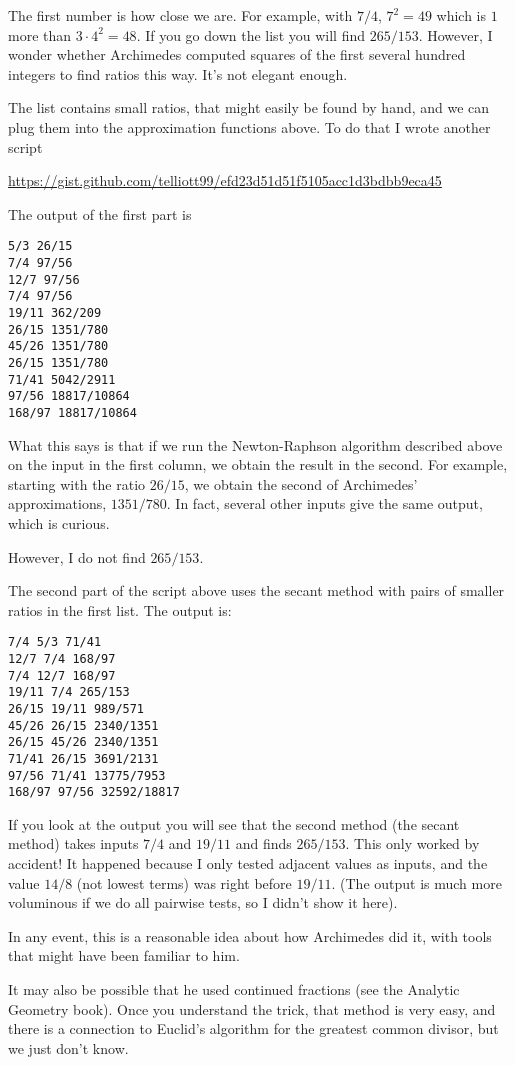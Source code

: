 \documentclass[11pt, oneside]{article}
\begin{document}
The first number is how close we are.  For example, with $7/4$, $7^2 = 49$ which is $1$ more than $3 \cdot 4^2 = 48$.  If you go down the list you will find $265/153$.  However, I wonder whether Archimedes computed squares of the first several hundred integers to find ratios this way.  It's not elegant enough.

The list contains small ratios, that might easily be found by hand, and we can plug them into the approximation functions above.  To do that I wrote another script

\url{https://gist.github.com/telliott99/efd23d51d51f5105acc1d3bdbb9eca45}

The output of the first part is

\begin{verbatim}
5/3 26/15
7/4 97/56
12/7 97/56
7/4 97/56
19/11 362/209
26/15 1351/780
45/26 1351/780
26/15 1351/780
71/41 5042/2911
97/56 18817/10864
168/97 18817/10864
\end{verbatim}

What this says is that if we run the Newton-Raphson algorithm described above on the input in the first column, we obtain the result in the second.  For example, starting with the ratio $26/15$, we obtain the second of Archimedes' approximations, $1351/780$.  In fact, several other inputs give the same output, which is curious.

However, I do not find $265/153$.

The second part of the script above uses the secant method with pairs of smaller ratios in the first list.  The output is:

\begin{verbatim}
7/4 5/3 71/41
12/7 7/4 168/97
7/4 12/7 168/97
19/11 7/4 265/153
26/15 19/11 989/571
45/26 26/15 2340/1351
26/15 45/26 2340/1351
71/41 26/15 3691/2131
97/56 71/41 13775/7953
168/97 97/56 32592/18817
\end{verbatim}

If you look at the output you will see that the second method (the secant method) takes inputs $7/4$ and $19/11$ and finds $265/153$.  This only worked by accident!  It happened because I only tested adjacent values as inputs, and the value $14/8$ (not lowest terms) was right before $19/11$.  (The output is much more voluminous if we do all pairwise tests, so I didn't show it here).

In any event, this is a reasonable idea about how Archimedes did it, with tools that might have been familiar to him.

It may also be possible that he used continued fractions (see the Analytic Geometry book).  Once you understand the trick, that method is very easy, and there is a connection to Euclid's algorithm for the greatest common divisor, but we just don't know.
\end{document}
